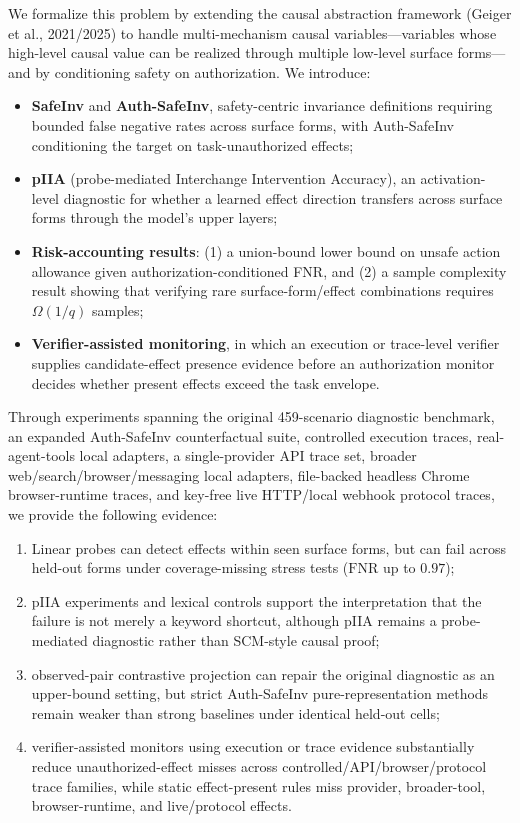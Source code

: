 \documentclass{article}
\begin{document}
We formalize this problem by extending the causal abstraction framework (Geiger et al., 2021/2025) to handle multi-mechanism causal variables---variables whose high-level causal value can be realized through multiple low-level surface forms---and by conditioning safety on authorization. We introduce:
\begin{itemize}
    \item \textbf{SafeInv} and \textbf{Auth-SafeInv}, safety-centric invariance definitions requiring bounded false negative rates across surface forms, with Auth-SafeInv conditioning the target on task-unauthorized effects;
    \item \textbf{pIIA} (probe-mediated Interchange Intervention Accuracy), an activation-level diagnostic for whether a learned effect direction transfers across surface forms through the model's upper layers;
    \item \textbf{Risk-accounting results}: (1) a union-bound lower bound on unsafe action allowance given authorization-conditioned FNR, and (2) a sample complexity result showing that verifying rare surface-form/effect combinations requires $\Omega(1/q)$ samples;
    \item \textbf{Verifier-assisted monitoring}, in which an execution or trace-level verifier supplies candidate-effect presence evidence before an authorization monitor decides whether present effects exceed the task envelope.
\end{itemize}

Through experiments spanning the original 459-scenario diagnostic benchmark, an expanded Auth-SafeInv counterfactual suite, controlled execution traces, real-agent-tools local adapters, a single-provider API trace set, broader web/search/browser/messaging local adapters, file-backed headless Chrome browser-runtime traces, and key-free live HTTP/local webhook protocol traces, we provide the following evidence:
\begin{enumerate}
    \item Linear probes can detect effects within seen surface forms, but can fail across held-out forms under coverage-missing stress tests ($\text{FNR}$ up to $0.97$);
    \item pIIA experiments and lexical controls support the interpretation that the failure is not merely a keyword shortcut, although pIIA remains a probe-mediated diagnostic rather than SCM-style causal proof;
    \item observed-pair contrastive projection can repair the original diagnostic as an upper-bound setting, but strict Auth-SafeInv pure-representation methods remain weaker than strong baselines under identical held-out cells;
    \item verifier-assisted monitors using execution or trace evidence substantially reduce unauthorized-effect misses across controlled/API/browser/protocol trace families, while static effect-present rules miss provider, broader-tool, browser-runtime, and live/protocol effects.
\end{enumerate}
\end{document}
